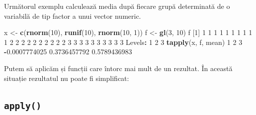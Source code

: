\documentclass[]{article}
\newenvironment{Shaded}{\begin{snugshade}}{\end{snugshade}}
\newcommand{\KeywordTok}[1]{\textcolor[rgb]{0.13,0.29,0.53}{\textbf{#1}}}
\newcommand{\DataTypeTok}[1]{\textcolor[rgb]{0.13,0.29,0.53}{#1}}
\newcommand{\DecValTok}[1]{\textcolor[rgb]{0.00,0.00,0.81}{#1}}
\newcommand{\FloatTok}[1]{\textcolor[rgb]{0.00,0.00,0.81}{#1}}
\newcommand{\StringTok}[1]{\textcolor[rgb]{0.31,0.60,0.02}{#1}}
\newcommand{\OperatorTok}[1]{\textcolor[rgb]{0.81,0.36,0.00}{\textbf{#1}}}
\newcommand{\NormalTok}[1]{#1}
\newcounter{exo}[section]
\begin{document}
Următorul exemplu calculează media după fiecare grupă determinată de o
variabilă de tip factor a unui vector numeric.

\begin{Shaded}
\begin{Highlighting}[]
\NormalTok{x <-}\StringTok{ }\KeywordTok{c}\NormalTok{(}\KeywordTok{rnorm}\NormalTok{(}\DecValTok{10}\NormalTok{), }\KeywordTok{runif}\NormalTok{(}\DecValTok{10}\NormalTok{), }\KeywordTok{rnorm}\NormalTok{(}\DecValTok{10}\NormalTok{, }\DecValTok{1}\NormalTok{))}
\NormalTok{f <-}\StringTok{ }\KeywordTok{gl}\NormalTok{(}\DecValTok{3}\NormalTok{, }\DecValTok{10}\NormalTok{)   }
\NormalTok{f}
\NormalTok{ [}\DecValTok{1}\NormalTok{] }\DecValTok{1} \DecValTok{1} \DecValTok{1} \DecValTok{1} \DecValTok{1} \DecValTok{1} \DecValTok{1} \DecValTok{1} \DecValTok{1} \DecValTok{1} \DecValTok{2} \DecValTok{2} \DecValTok{2} \DecValTok{2} \DecValTok{2} \DecValTok{2} \DecValTok{2} \DecValTok{2} \DecValTok{2} \DecValTok{2} \DecValTok{3} \DecValTok{3} \DecValTok{3} \DecValTok{3} \DecValTok{3} \DecValTok{3} \DecValTok{3} \DecValTok{3} \DecValTok{3} \DecValTok{3}
\NormalTok{Levels}\OperatorTok{:}\StringTok{ }\DecValTok{1} \DecValTok{2} \DecValTok{3}
\KeywordTok{tapply}\NormalTok{(x, f, mean)}
            \DecValTok{1}             \DecValTok{2}             \DecValTok{3} 
\OperatorTok{-}\FloatTok{0.0007774025}  \FloatTok{0.3736457792}  \FloatTok{0.5789436983} 
\end{Highlighting}
\end{Shaded}

Putem să aplicăm și funcții care întorc mai mult de un rezultat. În
această situație rezultatul nu poate fi simplificat:

\begin{Shaded}
\end{Shaded}

\subsection{\texorpdfstring{\texttt{apply()}}{apply()}}\label{apply}
\end{document}
